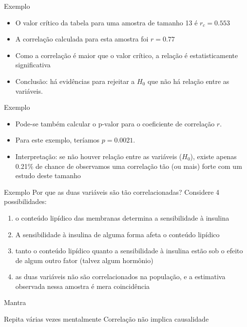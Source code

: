\documentclass{beamer}
\begin{document}
\begin{frame}{Exemplo}
  \begin{itemize}
  \item O valor crítico da tabela para uma amostra de tamanho 13 é
    $r_c = 0.553$
  \item A correlação calculada para esta amostra foi $r=0.77$
  \item Como a correlação é maior que o valor crítico, a relação é
    estatisticamente significativa
  \item Conclusão: há evidências para rejeitar a $H_0$ que não há
    relação entre as variáveis.
  \end{itemize}
\end{frame}

\begin{frame}{Exemplo}
  \begin{itemize}
  \item Pode-se também calcular o p-valor para o coeficiente de
    correlação $r$.
  \item Para este exemplo, teríamos $p=0.0021$.
  \item Interpretação: se não houver relação entre as variáveis
    ($H_0$), existe apenas 0.21\% de chance de observamos uma
    correlação tão (ou mais) forte com um estudo deste tamanho
  \end{itemize}
\end{frame}

\begin{frame}{Exemplo}
  Por que as duas variáveis são tão correlacionadas? Considere 4
  possibilidades:
  \begin{enumerate}
  \item o conteúdo lipídico das membranas \alert<1>{determina} a
    sensibilidade à insulina
  \item A sensibilidade à insulina de alguma forma \alert<2>{afeta} o conteúdo lipídico
  \item tanto o conteúdo lipídico quanto a sensibilidade à insulina
    estão sob o efeito de \alert<3>{algum outro} fator (talvez algum hormônio)
  \item as duas variáveis não são correlacionados na população, e a
    estimativa observada nessa amostra é \alert<4>{mera coincidência}
  \end{enumerate}
\end{frame}

\begin{frame}[label=mantra]{{\small Mantra}}
  \begin{block}{Repita várias vezes mentalmente}
    \LARGE
    \centering
    Correlação não implica causalidade
  \end{block}
\end{frame}
\end{document}
